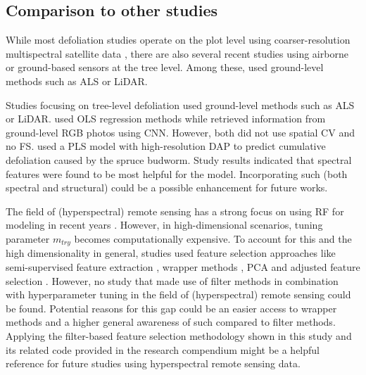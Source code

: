 \documentclass[final]{IEEEtran}
\begin{document}
\subsection{Comparison to other studies}

While most defoliation studies operate on the plot level using coarser-resolution multispectral satellite data \cite{townsend2012, debeurs2008, rengarajan2016}, there are also several recent studies using airborne or ground-based sensors at the tree level.
Among these, \cite{meng2018, kalin2019} used ground-level methods such as \ac{ALS} or \ac{LiDAR}.

Studies focusing on tree-level defoliation used ground-level methods such as \ac{ALS} or \ac{LiDAR}\cite{meng2018, kalin2019}.
\cite{meng2018} used \ac{OLS} regression methods while \cite{kalin2019} retrieved information from ground-level RGB photos using \ac{CNN}.
However, both did not use spatial \ac{CV} and \cite{kalin2019} no \ac{FS}.
\cite{goodbody2018} used a \ac{PLS} model with high-resolution \ac{DAP} to predict cumulative defoliation caused by the spruce budworm.
Study results indicated that spectral features were found to be most helpful for the model.
Incorporating such (both spectral and structural) could be a possible enhancement for future works.

The field of (hyperspectral) remote sensing has a strong focus on using RF for modeling in recent years \cite{belgiu2016}.
However, in high-dimensional scenarios, tuning parameter \texttt{\(m_{try}\)} becomes computationally expensive.
To account for this and the high dimensionality in general, studies used feature selection approaches like semi-supervised feature extraction \cite{xia2015}, wrapper methods \cite{fassnacht2014a, feng2016, georganos2018}, PCA and adjusted feature selection \cite{rochac2016}.
However, no study that made use of filter methods in combination with hyperparameter tuning in the field of (hyperspectral) remote sensing could be found.
Potential reasons for this gap could be an easier access to wrapper methods and a higher general awareness of such compared to filter methods.
Applying the filter-based feature selection methodology shown in this study and its related code provided in the research compendium might be a helpful reference for future studies using hyperspectral remote sensing data.
\end{document}
